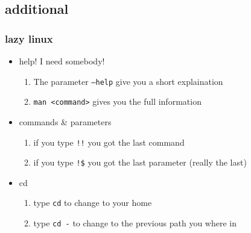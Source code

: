 \documentclass[hyperref={pdfpagelabels=false}]{beamer}
\newcommand{\code}[1]{\colorbox{lGray}{\texttt{#1}}}
\begin{document}
    \subsection{additional}
        \begin{frame}
			\frametitle{lazy linux}
			\begin{itemize}
                \item<1-> help! I need somebody!
                \begin{enumerate}
                    \item<2-> The parameter \code{--help} give you a short explaination
                    \item<3-> \code{man \textless command\textgreater} gives you the full information
                \end{enumerate}
                \item<4-> commands \& parameters
                \begin{enumerate}
                    \item<5-> if you type \code{!!} you got the last command 
                    \item<6-> if you type \code{!\$} you got the last parameter (really the last)
                \end{enumerate}
                \item<7-> cd
                \begin{enumerate}
                    \item<8-> type \code{cd} to change to your home
                    \item<9-> type \code{cd -} to change to the previous path you where in
                \end{enumerate}
            \end{itemize}
		\end{frame}
    
\end{document}
